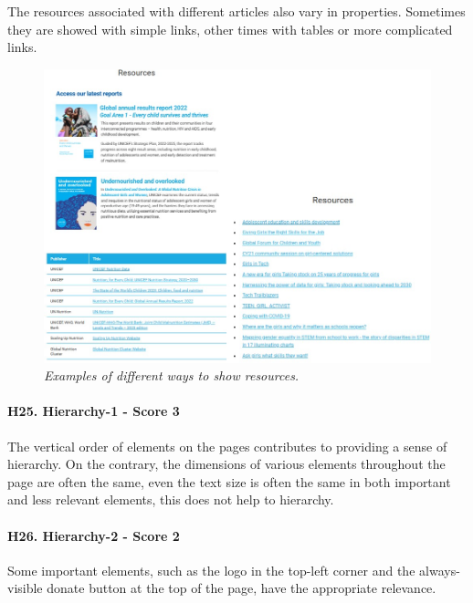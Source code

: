 \newline The resources associated with different articles also vary in properties. Sometimes they are showed with simple links, other times with tables or more complicated links.
\begin{figure}[!h]
	\begin{center}
		\includegraphics[width=\textwidth]{FinalScores29.jpg}
		\captionsetup{font=small}
		\caption{\textit{Examples of different ways to show resources.}}
	\end{center}
\end{figure}
\newline
\newline \paragraph{H25. Hierarchy-1 - Score 3}  \label{subsec:H25}	The vertical order of elements on the pages contributes to providing a sense of hierarchy. On the contrary, the dimensions of various elements throughout the page are often the same, even the text size is often the same in both important and less relevant elements, this does not help to hierarchy.
\newline
\newline \paragraph{H26. Hierarchy-2 - Score 2}	\label{subsec:H26} Some important elements, such as the logo in the top-left corner and the always-visible donate button at the top of the page, have the appropriate relevance.
